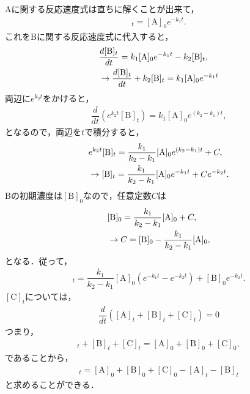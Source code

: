 \setcounter{section}{3}
\setcounter{equation}{0}
\noindent
Aに関する反応速度式は直ちに解くことが出来て，
\begin{align}
 [\mathrm{A}]_t = [\mathrm{A}]_{0}e^{-k_1 t}. 
\end{align}
これをBに関する反応速度式に代入すると，
\begin{align}
 &\dfrac{d[\mathrm{B}]_{t}}{dt} = k_1 [\mathrm{A}]_0 e^{-k_1 t} - k_2 [\mathrm{B}]_t, \notag \\
 &\rightarrow \dfrac{d[\mathrm{B}]_t}{dt} + k_2 [\mathrm{B}]_t = k_1 [\mathrm{A}]_0 e^{-k_1 t} 
\end{align}
両辺に$e^{k_2 t}$をかけると，
\begin{align}
  \dfrac{d}{dt}\left(e^{k_2 t}[\mathrm{B}]_t\right) = k_1 [\mathrm{A}]_0 e^{\left(k_2 - k_1\right)t}, 
\end{align}
となるので，両辺を$t$で積分すると，
\begin{align}
 & e^{k_2 t}[\mathrm{B}]_t = \dfrac{k_1}{k_2 - k_1}[\mathrm{A}]_0 e^{(k_2 - k_1)t} + C, \notag \\
 &\rightarrow [\mathrm{B}]_t = \dfrac{k_1}{k_2 - k_1}[\mathrm{A}]_0 e^{- k_1 t} + Ce^{-k_2 t}. 
\end{align}
Bの初期濃度は$[\mathrm{B}]_0$なので，任意定数$C$は
\begin{align}
  &[\mathrm{B}]_0 = \dfrac{k_1}{k_2 - k_1}[\mathrm{A}]_0 + C, \notag \\
  &\rightarrow C = [\mathrm{B}]_0 - \dfrac{k_1}{k_2 - k_1}[\mathrm{A}]_0,
\end{align}
となる．従って，
\begin{align}
 [\mathrm{B}]_t = \dfrac{k_1}{k_2 - k_1}[\mathrm{A}]_0 \left(e^{-k_1 t}-e^{-k_2 t}\right) + [\mathrm{B}]_0 e^{-k_2 t}. 
\end{align}
$[\mathrm{C}]_t$については，
\begin{align}
 \dfrac{d}{dt}\left([\mathrm{A}]_t + [\mathrm{B}]_t + [\mathrm{C}]_t\right) = 0 
\end{align}
つまり，
\begin{align}
 [\mathrm{A}]_t + [\mathrm{B}]_t + [\mathrm{C}]_t =[\mathrm{A}]_0 + [\mathrm{B}]_0 + [\mathrm{C}]_0,
\end{align}
であることから，
\begin{align}
 [\mathrm{C}]_t = [\mathrm{A}]_0 + [\mathrm{B}]_0 + [\mathrm{C}]_0 - [\mathrm{A}]_t - [\mathrm{B}]_t
\end{align}
と求めることができる．

